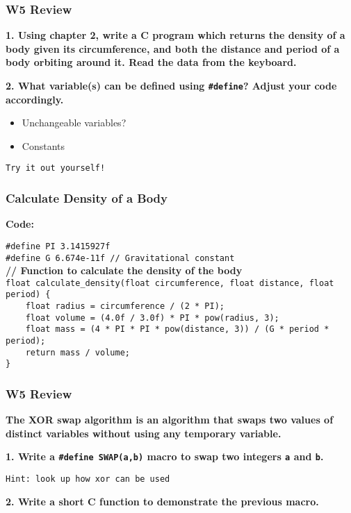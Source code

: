 \documentclass[
	11pt, %
]{beamer}
\begin{document}

\begin{frame}
    \frametitle{W5 Review}
    \textbf{1. Using chapter 2, write a C program which returns the density of a body given its circumference, and both the distance and period of a body orbiting around it. Read the data from the keyboard.}

\smallskip

    \textbf{2. What variable(s) can be defined using \texttt{\#define}? Adjust your code accordingly.}
    \begin{itemize}
        \item Unchangeable variables?
        \item Constants
    \end{itemize}

    \smallskip
    \texttt{Try it out yourself!}
\end{frame}


\begin{frame}
    \frametitle{Calculate Density of a Body}
    \textbf{Code:}
	
    \texttt{\#define PI 3.1415927f} \\ 
    \texttt{\#define G 6.674e-11f // Gravitational constant} \\[7pt]
    \textbf{// Function to calculate the density of the body} \\ 
    \texttt{float calculate\_density(float circumference, float distance, float period) \{} \\ 
    \texttt{~~~~float radius = circumference / (2 * PI);} \\ 
    \texttt{~~~~float volume = (4.0f / 3.0f) * PI * pow(radius, 3);} \\ 
    \texttt{~~~~float mass = (4 * PI * PI * pow(distance, 3)) / (G * period * period);} \\ 
    \texttt{~~~~return mass / volume;} \\ 
    \texttt{\}}
\end{frame}


\begin{frame}
    \frametitle{W5 Review}
    \textbf{The XOR swap algorithm is an algorithm that swaps two values of distinct variables without using any temporary variable.}

    \smallskip

    \textbf{1. Write a \texttt{\#define SWAP(a,b)} macro to swap two integers \texttt{a} and \texttt{b}.}
    
    \smallskip
	\texttt{Hint: look up how xor can be used}

    \textbf{2. Write a short C function to demonstrate the previous macro.}

    \smallskip


\end{frame}
\end{document}
